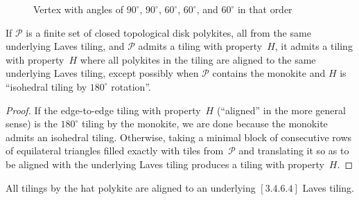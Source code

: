 \begin{figure}[htp!]
\begin{center}
\end{center}
\caption{Vertex with angles of $90^\circ$, $90^\circ$, $60^\circ$,
  $60^\circ$, and $60^\circ$ in that order}
\label{fig:kiteslidvertex}
\end{figure}

\begin{lemma}
\label{lemma:polykitealign}
If $\mathcal{P}$ is a finite set of closed topological disk polykites,
all from the same underlying Laves tiling, and $\mathcal{P}$ admits a
tiling with property~$H$, it admits a tiling with property~$H$ where
all polykites in the tiling are aligned to the same underlying Laves
tiling, except possibly when $\mathcal{P}$ contains the monokite and
$H$ is ``isohedral tiling by $180^\circ$ rotation''.
\end{lemma}

\begin{proof}
If the edge-to-edge tiling with property~$H$ (``aligned'' in the more
general sense) is the $180^\circ$ tiling by the monokite, we are done
because the monokite admits an isohedral tiling.  Otherwise, taking a
minimal block of consecutive rows of equilateral triangles filled
exactly with tiles from~$\mathcal{P}$ and translating it so as to be
aligned with the underlying Laves tiling produces a tiling with
property~$H$.
\end{proof}

\begin{lemma}
\label{lemma:tileaalign}
All tilings by the hat polykite are aligned
to an underlying $[3.4.6.4]$ Laves tiling.
\end{lemma}

